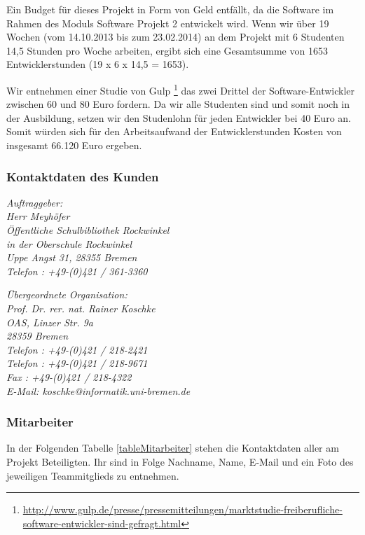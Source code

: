 \documentclass[fontsize=12pt,paper=a4,twoside]{scrartcl}
\begin{document}
Ein Budget für dieses Projekt in Form von Geld entfällt, da die Software im Rahmen des Moduls Software Projekt 2 entwickelt wird. Wenn wir über 19 Wochen (vom 14.10.2013 bis zum 23.02.2014) an dem Projekt mit 6 Studenten 14,5 Stunden pro Woche arbeiten, ergibt sich eine Gesamtsumme von 1653 Entwicklerstunden (19 x 6 x 14,5 = 1653).

Wir entnehmen einer Studie von Gulp \footnote{\url{http://www.gulp.de/presse/pressemitteilungen/marktstudie-freiberufliche-software-entwickler-sind-gefragt.html}} das zwei Drittel der Software-Entwickler zwischen 60 und 80 Euro fordern. Da wir alle Studenten sind und somit noch in der Ausbildung, setzen wir den Studenlohn für jeden Entwickler bei 40 Euro an. Somit würden sich für den Arbeitsaufwand der Entwicklerstunden Kosten von insgesamt 66.120 Euro ergeben.

\subsubsection{Kontaktdaten des Kunden}

{\em Auftraggeber:\\
	Herr Meyhöfer\\
	Öffentliche Schulbibliothek Rockwinkel\\
	in der Oberschule Rockwinkel\\
	Uppe Angst 31, 28355 Bremen\\
	Telefon : +49-(0)421 / 361-3360\\
}

{\em Übergeordnete Organisation:\\ 
	Prof. Dr. rer. nat. Rainer Koschke\\
	OAS, Linzer Str. 9a\\
	28359 Bremen\\
	Telefon : +49-(0)421 / 218-2421\\
	Telefon : +49-(0)421 / 218-9671\\
	Fax : +49-(0)421 / 218-4322\\
	E-Mail: koschke@informatik.uni-bremen.de
}

\subsubsection{Mitarbeiter}

In der Folgenden Tabelle \ref{tableMitarbeiter} stehen die Kontaktdaten aller am Projekt Beteiligten. Ihr sind in Folge Nachname, Name, E-Mail und ein Foto des jeweiligen Teammitglieds zu entnehmen.
\end{document}
